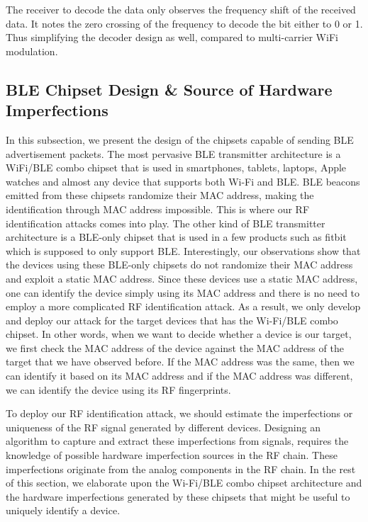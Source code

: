 The receiver to decode the data only observes the frequency shift of the received data. It notes the zero crossing of the frequency to decode the bit either to 0 or 1. Thus simplifying the decoder design as well, compared to multi-carrier WiFi modulation. 

\subsection{BLE Chipset Design \& Source of Hardware Imperfections}
In this subsection, we present the design of the chipsets capable of sending BLE advertisement packets. The most pervasive BLE transmitter architecture is a WiFi/BLE combo chipset that is used in smartphones, tablets, laptops, Apple watches and almost any device that supports both Wi-Fi and BLE. BLE beacons emitted from these chipsets randomize their MAC address, making the identification through MAC address impossible. This is where our RF identification attacks comes into play. The other kind of BLE transmitter architecture is a BLE-only chipset that is used in a few products such as fitbit which is supposed to only support BLE. Interestingly, our observations show that the devices using these BLE-only chipsets do not randomize their MAC address and exploit a static MAC address. Since these devices use a static MAC address, one can identify the device simply using its MAC address and there is no need to employ a more complicated RF identification attack. As a result, we only develop and deploy our attack for the target devices that has the Wi-Fi/BLE combo chipset. In other words, when we want to decide whether a device is our target, we first check the MAC address of the device against the MAC address of the target that we have observed before. If the MAC address was the same, then we can identify it based on its MAC address and if the MAC address was different, we can identify the device using its RF fingerprints.

To deploy our RF identification attack, we should estimate the imperfections or uniqueness of the RF signal generated by different devices. Designing an algorithm to capture and extract these imperfections from signals, requires the knowledge of possible hardware imperfection sources in the RF chain. These imperfections originate from the analog components in the RF chain. In the rest of this section, we elaborate upon the Wi-Fi/BLE combo chipset architecture and the hardware imperfections generated by these chipsets that might be useful to uniquely identify a device.


